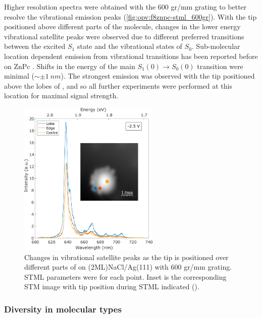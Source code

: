 Higher resolution spectra were obtained with the 600 gr/mm grating to better resolve the vibrational emission peaks (\autoref{fig:opv:f8znpc-stml_600gr}). With the tip positioned above different parts of the molecule, changes in the lower energy vibrational satellite peaks were observed due to different preferred transitions between the excited $S_1$ state and the vibrational states of $S_0$. Sub-molecular location dependent emission from vibrational transitions has been reported before on ZnPc \citep{Zhang2016,Doppagne2017}. Shifts in the energy of the main $S_1(0) \rightarrow S_0(0)$ transition were minimal ($\sim \pm \SI{1}{nm}$). The strongest emission was observed with the tip positioned above the lobes of , and so all further experiments were performed at this location for maximal signal strength.


\begin{figure}[H]
    \centering
        \includegraphics[width=0.6\textwidth]{pictures/f8znpc_-ve_emission_inset600_position.png}
        \caption{Changes in vibrational satellite peaks as the tip is positioned over different parts of  on (2ML)NaCl/Ag(111) with 600 gr/mm grating. STML parameters were  for each point. Inset is the corresponding STM image with tip position during STML indicated ().}
        \label{fig:opv:f8znpc-stml_600gr}
\end{figure}



\subsubsection*{Diversity in molecular types}

